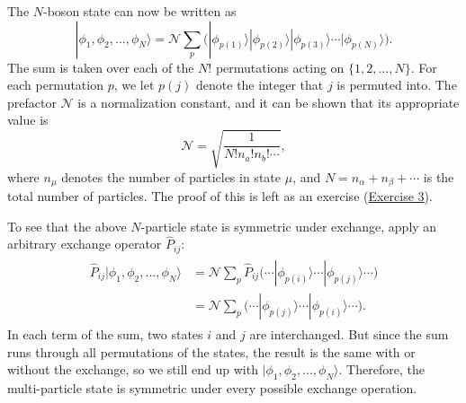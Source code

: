 \documentclass[pra,12pt]{revtex4}
\begin{document}
The $N$-boson state can now be written as
\begin{equation}
  |\phi_1,\phi_2,\dots,\phi_N\rangle = \mathcal{N} \sum_p \Big(|\phi_{p(1)}\rangle  |\phi_{p(2)}\rangle  |\phi_{p(3)}\rangle  \cdots  |\phi_{p(N)}\rangle\Big).
\end{equation}
The sum is taken over each of the $N!$ permutations acting on
$\{1,2,\dots,N\}$.  For each permutation $p$, we let $p(j)$ denote the
integer that $j$ is permuted into.  The prefactor $\mathcal{N}$ is a
normalization constant, and it can be shown that its appropriate value
is
\begin{equation}
  \mathcal{N} = \sqrt{\frac{1}{N!n_a!n_b!\cdots}},
\end{equation}
where $n_\mu$ denotes the number of particles in state $\mu$, and $N =
n_\alpha + n_\beta + \cdots$ is the total number of particles.  The proof of
this is left as an exercise (\hyperref[ex:boson_norm]{Exercise 3}).

To see that the above $N$-particle state is symmetric under exchange,
apply an arbitrary exchange operator $\hat{P}_{ij}$:
\begin{align}
  \begin{aligned}\hat{P}_{ij}|\phi_1,\phi_2,\dots,\phi_N\rangle &= \mathcal{N} \sum_p \hat{P}_{ij} \Big(\cdots  |\phi_{p(i)}\rangle  \cdots  |\phi_{p(j)}\rangle\cdots\Big) \\&= \mathcal{N} \sum_p \Big(\cdots  |\phi_{p(j)}\rangle  \cdots  |\phi_{p(i)}\rangle\cdots\Big).\end{aligned}
\end{align}
In each term of the sum, two states $i$ and $j$ are interchanged.  But
since the sum runs through all permutations of the states, the result
is the same with or without the exchange, so we still end up with
$|\phi_1,\phi_2,\dots,\phi_N\rangle$.  Therefore, the multi-particle
state is symmetric under every possible exchange operation.
\end{document}
